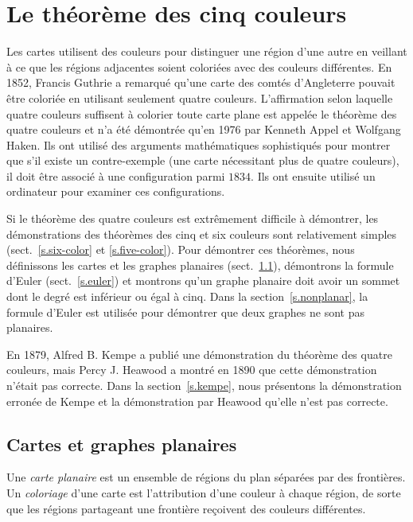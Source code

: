 
\chapter{Le théorème des cinq couleurs}\label{c.five}




Les cartes utilisent des couleurs pour distinguer une région d'une autre en veillant à ce que les régions adjacentes soient coloriées avec des couleurs différentes. En 1852, Francis Guthrie a remarqué qu'une carte des comtés d'Angleterre pouvait être coloriée en utilisant seulement quatre couleurs. L'affirmation selon laquelle quatre couleurs suffisent à colorier toute carte plane est appelée le théorème des quatre couleurs et n'a été démontrée qu'en 1976 par Kenneth Appel et Wolfgang Haken. Ils ont utilisé des arguments mathématiques sophistiqués pour montrer que s'il existe un contre-exemple (une carte nécessitant plus de quatre couleurs), il doit être associé à une configuration parmi $1834$. Ils ont ensuite utilisé un ordinateur pour examiner ces configurations.

Si le théorème des quatre couleurs est extrêmement difficile à démontrer, les démonstrations des théorèmes des cinq et six couleurs sont relativement simples (sect.~\ref{s.six-color} et \ref{s.five-color}). Pour démontrer ces théorèmes, nous définissons les cartes et les graphes planaires (sect.~\ref{s.planar}), démontrons la formule d'Euler (sect.~\ref{s.euler}) et montrons qu'un graphe planaire doit avoir un sommet dont le degré est inférieur ou égal à cinq. Dans la section~\ref{s.nonplanar}, la formule d'Euler est utilisée pour démontrer que deux graphes ne sont pas planaires.

En 1879, Alfred B. Kempe a publié une démonstration du théorème des quatre couleurs, mais  Percy J. Heawood a montré en 1890 que cette démonstration n'était pas correcte. Dans la section~\ref{s.kempe}, nous présentons la démonstration erronée de Kempe et la démonstration par Heawood qu'elle n'est pas correcte.

\section{Cartes  et graphes planaires}\label{s.planar}

\begin{definition}
Une \emph{carte planaire} est un ensemble de régions du plan séparées par des frontières. Un \emph{coloriage} d'une carte est l'attribution d'une couleur à chaque région, de sorte que les régions partageant une frontière reçoivent des couleurs différentes.
\end{definition}

